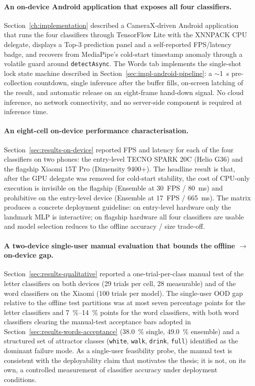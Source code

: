 \paragraph{An on-device Android application that exposes all four
classifiers.}
Section~\ref{ch:implementation} described a CameraX-driven Android
application that runs the four classifiers through TensorFlow Lite
with the XNNPACK CPU delegate, displays a Top-3 prediction panel and
a self-reported FPS/latency badge, and recovers from MediaPipe's
cold-start timestamp anomaly through a volatile guard around
\texttt{detectAsync}. The Words tab implements the single-shot lock
state machine described in Section~\ref{sec:impl-android-pipeline}:
a \(\sim\)1~s pre-collection countdown, single inference after the
buffer fills, on-screen latching of the result, and automatic
release on an eight-frame hand-down signal. No cloud inference, no
network connectivity, and no server-side component is required at
inference time.

\paragraph{An eight-cell on-device performance characterisation.}
Section~\ref{sec:results-on-device} reported FPS and latency for
each of the four classifiers on two phones: the entry-level
TECNO SPARK 20C (Helio G36) and the flagship Xiaomi 15T Pro
(Dimensity 9400+). The headline result is that, after the
GPU delegate was removed for cold-start stability, the cost of
CPU-only execution is invisible on the flagship (Ensemble at
\SI{30}{FPS} / \SI{80}{ms}) and prohibitive on the entry-level
device (Ensemble at \SI{17}{FPS} / \SI{665}{ms}). The matrix
produces a concrete deployment guideline: on entry-level
hardware only the landmark MLP is interactive; on flagship
hardware all four classifiers are usable and model selection
reduces to the offline accuracy / size trade-off.

\paragraph{A two-device single-user manual evaluation that bounds
the offline {$\rightarrow$} on-device gap.}
Section~\ref{sec:results-qualitative} reported a one-trial-per-class
manual test of the letter classifiers on both devices (29 trials per
cell, 28 measurable) and of the word classifiers on the Xiaomi (100
trials per model). The single-user OOD gap relative to the offline
test partitions was at most seven percentage points for the letter
classifiers and \SIrange{7}{14}{\percent} points for the word
classifiers, with both word classifiers clearing the manual-test
acceptance bars adopted in Section~\ref{sec:results-words-acceptance}
(\SI{38.0}{\percent} single, \SI{49.0}{\percent} ensemble) and a
structured set of attractor classes
(\texttt{white}, \texttt{walk}, \texttt{drink}, \texttt{full})
identified as the dominant failure mode. As a single-user
feasibility probe, the manual test is consistent with the
deployability claim that motivates the thesis; it is not, on its own,
a controlled measurement of classifier accuracy under deployment
conditions.

